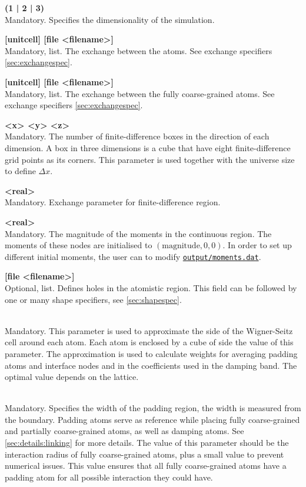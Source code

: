 \documentclass[11pt,fleqn,a4]{book} %
\makeatletter
\newcommand{\litem}[1]{\item[\bfseries#1\index{#1@\texttt{#1}}\label{#1}]}
\newcommand{\rfilename}[1]{\hyperref[#1]{\texttt{#1}}}
\makeatother
\begin{document}
\begin{description}[leftmargin=!,labelwidth=\widthof{\bfseries 9999}]
%  
\litem{dimension} {\bf(1 | 2 | 3)}   \\Mandatory. Specifies the dimensionality of the simulation.
\litem{exchange_atoms} {\bf {[unitcell] [file <filename>]}} \\  Mandatory, list. The exchange between the atoms. See exchange specifiers \autoref{sec:exchangespec}.
%  
\litem{exchange_coarse} {\bf{[unitcell] [file <filename>]}}  \\Mandatory, list. The exchange between the fully coarse-grained atoms. See exchange specifiers \autoref{sec:exchangespec}.
\litem{finitediff_boxes} {\bf<x> <y> <z>}  \\Mandatory. The number of finite-difference boxes in the direction of each dimension. A box in three dimensions is a cube that have eight finite-difference grid points as its corners. This parameter is used together with the universe size to define $\Delta x$.
\litem{continuous_exchange_coef} {\bf <real>}   \\Mandatory. Exchange parameter for finite-difference region.
\litem{continuous_moment_magnitude} {\bf <real>} \\ Mandatory. The magnitude of the moments in the continuous region. The moments of these nodes are initialised to $(\text{magnitude}, 0, 0)$. In order to set up different initial moments, the user can to modify \rfilename{output/moments.dat}.
\litem{hole_shape} {\bf{[file <filename>]}}  \\ Optional, list. Defines holes in the atomistic region. This field can be followed by one or many shape specifiers, see \autoref{sec:shapespec}.
\litem{atom_lattice_spacing} {\bf<positive real>}  \\  Mandatory. This parameter is used to approximate the side of the Wigner-Seitz cell around each atom. Each atom is enclosed by a cube of side the value of this parameter. The approximation is used to calculate weights for averaging padding atoms and interface nodes and in the coefficients used in the damping band. The optimal value depends on the lattice.
\litem{padding_width} {\bf <positive real>} \\ Mandatory. Specifies the width of the padding region, the width is measured from the boundary. Padding atoms serve as reference while placing fully coarse-grained and partially coarse-grained atoms, as well as damping atoms. See \autoref{sec:details:linking} for more details. The value of this parameter should be the interaction radius of fully coarse-grained atoms, plus a small value to prevent numerical issues. This value ensures that all fully coarse-grained atoms have a padding atom for all possible interaction they could have.

\end{description}
\end{document}
